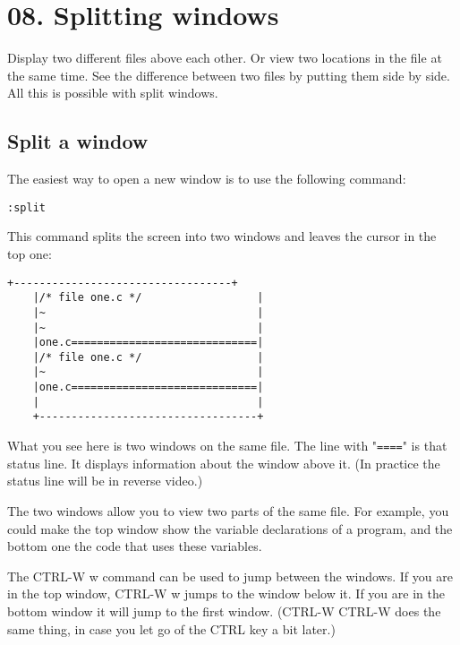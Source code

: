 \section{08. Splitting windows}
Display two different files above each other.
Or view two locations in the file at the same time.
See the difference between two files by putting them side by side.
All this is possible with split windows.
\localtableofcontents
\subsection{Split a window}

The easiest way to open a new window is to use the following command:

 \begin{Verbatim}[samepage=true]
 :split
 \end{Verbatim}

This command splits the screen into two windows and leaves the cursor in the top one:

\begin{Verbatim}[samepage=true]
    +----------------------------------+
    |/* file one.c */                  |
    |~                                 |
    |~                                 |
    |one.c=============================|
    |/* file one.c */                  |
    |~                                 |
    |one.c=============================|
    |                                  |
    +----------------------------------+
\end{Verbatim}

What you see here is two windows on the same file.
The line with "\texttt{====}" is that status line.
It displays information about the window above it.
(In practice the status line will be in reverse video.)

The two windows allow you to view two parts of the same file.
For example, you could make the top window show the variable declarations of a program, and the bottom one the code that uses these variables.

The CTRL-W w command can be used to jump between the windows.
If you are in the top window, CTRL-W w jumps to the window below it.
If you are in the bottom window it will jump to the first window.
(CTRL-W CTRL-W does the same thing, in case you let go of the CTRL key a bit later.)

